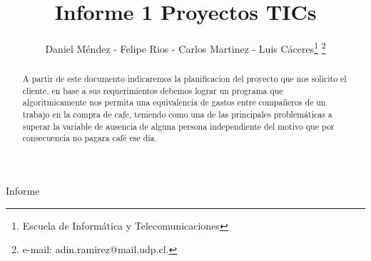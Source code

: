 \documentclass[twocolumn,11pts]{IEEEtran}
\begin{document}
\let\orilabel\label

%
\title{Informe 1 Proyectos TICs}
%

\author{Daniel Méndez - Felipe Rios - Carlos Martinez - Luis Cáceres\thanks{Escuela de Informática y Telecomunicaciones}%
\thanks{e-mail: adin.ramirez@mail.udp.cl.}%
}
% 
%


%
{Informe}%

\maketitle


\begin{abstract}
A partir de este documento indicaremos la planificacion del proyecto que nos solicito el cliente, en base a sus requerimientos debemos lograr un programa que algoritmicamente nos permita una equivalencia de gastos entre compañeros de un trabajo en la compra de cafe, teniendo como una de las principales problemáticas a superar la variable de ausencia de alguna persona independiente del motivo que por consecuencia no pagara café ese día.
\end{abstract}
\end{document}
